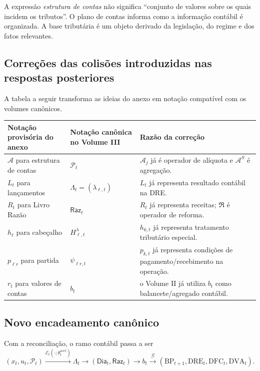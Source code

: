 \documentclass[11pt,a4paper]{article}
\newcommand{\BP}{\mathrm{BP}}
\newcommand{\DRE}{\mathrm{DRE}}
\newcommand{\DFC}{\mathrm{DFC}}
\newcommand{\DVA}{\mathrm{DVA}}
\newcommand{\cG}{\mathcal{G}}
\newcommand{\cA}{\mathcal{A}}
\newcommand{\Plano}{\mathcal{P}}
\newcommand{\cE}{\mathcal{E}}
\newcommand{\Dia}{\mathsf{Dia}}
\newcommand{\Raz}{\mathsf{Raz}}
\begin{document}
\begin{cuidado}
A expressão \emph{estrutura de contas} não significa ``conjunto de valores sobre os quais incidem os tributos''. O plano de contas informa como a informação contábil é organizada. A base tributária é um objeto derivado da legislação, do regime e dos fatos relevantes.
\end{cuidado}

\subsection{Correções das colisões introduzidas nas respostas posteriores}

A tabela a seguir transforma as ideias do anexo em notação compatível com os volumes canônicos.

\begin{longtable}{p{} p{} p{}}
\toprule
\textbf{Notação provisória do anexo} & \textbf{Notação canônica no Volume III} & \textbf{Razão da correção}\\
\midrule
$\mathcal A$ para estrutura de contas & $\Plano_t$ & $\cA_j$ já é operador de alíquota e $\cA^S$ é agregação.\\
$L_t$ para lançamentos & $\Lambda_t=(\lambda_{\ell,t})$ & $L_t$ já representa resultado contábil na DRE.\\
$R_t$ para Livro Razão & $\Raz_t$ & $R_t$ já representa receitas; $\mathfrak R$ é operador de reforma.\\
$h_\ell$ para cabeçalho & $H^\lambda_{\ell,t}$ & $h_{k,t}$ já representa tratamento tributário especial.\\
$p_{\ell r}$ para partida & $\psi_{\ell r,t}$ & $p_{k,t}$ já representa condições de pagamento/recebimento na operação.\\
$r_t$ para valores de contas & $b_t$ & o Volume II já utiliza $b_t$ como balancete/agregado contábil.\\
\bottomrule
\end{longtable}

\subsection{Novo encadeamento canônico}

Com a reconciliação, o ramo contábil passa a ser
\begin{equation}
\boxed{
(x_t,u_t,\Plano_t)
\xrightarrow{\cE_t(\cdot;\theta_t^{\mathrm{acct}})}
\Lambda_t
\longrightarrow
(\Dia_t,\Raz_t)
\longrightarrow
b_t
\xrightarrow{\cG}
(\BP_{t+1},\DRE_t,\DFC_t,\DVA_t).
}
\label{eq:new-accounting-spine}
\end{equation}
\end{document}
